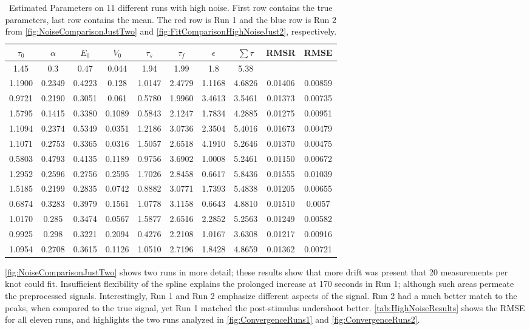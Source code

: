 \begin{table}[t]
\centering
\begin{tabular}{|c | c | c | c | c | c | c | c | c | c |}
\hline
$\tau_0$ & $\alpha$ & $E_0$    & $V_0$    & $\tau_s$ & $\tau_f$ & $\epsilon$  & $ \sum \tau $ & \ac{RMSR} & \ac{RMSE} \\
\hline
\rowcolor[gray]{.8}
1.45 & 0.3 & 0.47 & 0.044 & 1.94 & 1.99 & 1.8  & 5.38 &  & \\
\hline
\hline
1.1900 & 0.2349 & 0.4223 & 0.128  & 1.0147 & 2.4779 & 1.1168 & 4.6826 &0.01406 & 0.00859\\
0.9721 & 0.2190 & 0.3051 & 0.061  & 0.5780 & 1.9960 & 3.4613 & 3.5461 &0.01373 & 0.00735\\
1.5795 & 0.1415 & 0.3380 & 0.1089 & 0.5843 & 2.1247 & 1.7834 & 4.2885 &0.01275 & 0.00951\\
1.1094 & 0.2374 & 0.5349 & 0.0351 & 1.2186 & 3.0736 & 2.3504 & 5.4016 &0.01673 & 0.00479 \\
1.1071 & 0.2753 & 0.3365 & 0.0316 & 1.5057 & 2.6518 & 4.1910 & 5.2646 &0.01370 & 0.00475\\
0.5803 & 0.4793 & 0.4135 & 0.1189 & 0.9756 & 3.6902 & 1.0008 & 5.2461 &0.01150 & 0.00672\\
\rowcolor[rgb]{.9,.5,.5}
1.2952 & 0.2596 & 0.2756 & 0.2595 & 1.7026 & 2.8458 & 0.6617 & 5.8436 &0.01555 & 0.01039\\
\rowcolor[rgb]{.5,.5,.9}
1.5185 & 0.2199 & 0.2835 & 0.0742 & 0.8882 & 3.0771 & 1.7393 & 5.4838 &0.01205 & 0.00655\\
0.6874 & 0.3283 & 0.3979 & 0.1561 & 1.0778 & 3.1158 & 0.6643 & 4.8810 &0.01510 & 0.0057 \\
1.0170 & 0.285  & 0.3474 & 0.0567 & 1.5877 & 2.6516 & 2.2852 & 5.2563 &0.01249 & 0.00582\\
0.9925 & 0.298  & 0.3221 & 0.2094 & 0.4276 & 2.2108 & 1.0167 & 3.6308 &0.01217 & 0.00916\\
\hline
1.0954 & 0.2708 & 0.3615 & 0.1126 & 1.0510 & 2.7196 & 1.8428 & 4.8659 &0.01362 & 0.00721\\
\hline
\end{tabular}
\caption{Estimated Parameters on 11 different runs with high noise. First row contains the true parameters,
last row contains the mean.
The red row is Run 1 and the blue row is Run 2 from  \autoref{fig:NoiseComparisonJustTwo}
and \autoref{fig:FitComparisonHighNoiseJust2}, respectively.}
\label{tab:HighNoiseResults}
\end{table}

\autoref{fig:NoiseComparisonJustTwo} shows two runs in more detail; these
results show that more drift was present that 20 measurements per knot 
could fit. Insufficient flexibility of the spline explains
the prolonged increase at 170 seconds in Run 1; although such areas
permeate the preprocessed signals.
Interestingly, Run 1 and Run 2 emphasize
different aspects of the signal. Run 2 had a much better match to the
peaks, when compared to the true signal, yet Run 1 matched the post-stimulus
undershoot better.  \autoref{tab:HighNoiseResults} shows
the \ac{RMSE} for all eleven runs, and highlights the two runs analyzed
in \autoref{fig:ConvergenceRuns1} and \autoref{fig:ConvergenceRuns2}.


